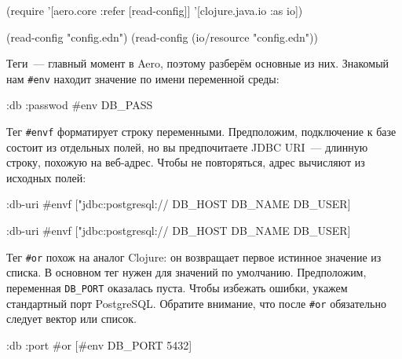 \else

\begin{english}
  \begin{clojure}
(require '[aero.core :refer [read-config]]
         '[clojure.java.io :as io])

(read-config "config.edn")
(read-config (io/resource "config.edn"))
  \end{clojure}
\end{english}

\fi


Теги~--- главный момент в Aero, поэтому разберём основные из них. Знакомый нам
\verb|#env| находит значение по имени переменной среды:

\begin{english}
  \begin{clojure}
{:db {:passwod #env DB_PASS}}
  \end{clojure}
\end{english}

Тег \verb|#envf| форматирует строку переменными. Предположим, подключение к базе
состоит из отдельных полей, но вы предпочитаете JDBC URI~--- длинную строку,
похожую на веб-адрес. Чтобы не повторяться, адрес вычисляют из исходных полей:

\ifnarrow

\begin{english}
  \begin{clojure}
{:db-uri
 #envf ["jdbc:postgresql://%
        DB_HOST DB_NAME DB_USER]}
  \end{clojure}
\end{english}

\else

\begin{english}
  \begin{clojure}
{:db-uri #envf ["jdbc:postgresql://%
                DB_HOST DB_NAME DB_USER]}
  \end{clojure}
\end{english}

\fi

Тег \verb|#or| похож на аналог Clojure: он возвращает первое истинное значение
из списка. В основном тег нужен для значений по умолчанию. Предположим,
переменная \verb|DB_PORT| оказалась пуста. Чтобы избежать ошибки, укажем
стандартный порт PostgreSQL. Обратите внимание, что после \verb|#or| обязательно
следует вектор или список.

\begin{english}
  \begin{clojure}
{:db {:port #or [#env DB_PORT 5432]}}
  \end{clojure}
\end{english}

